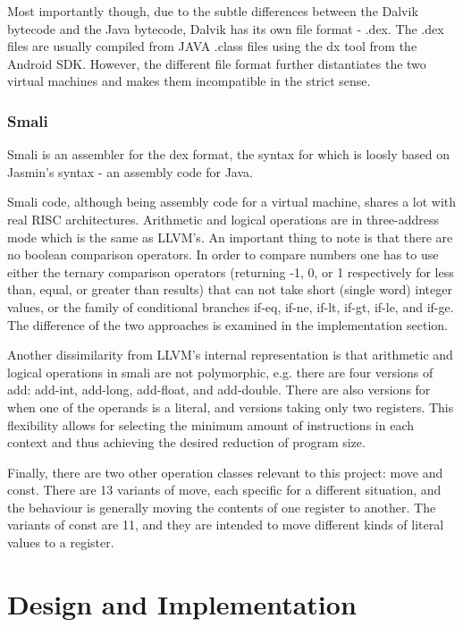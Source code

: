 \documentclass[parskip]{cs4rep}
\begin{document}
Most importantly though, due to the subtle differences between the Dalvik bytecode and the Java bytecode, Dalvik has its own file format - .dex. The .dex files are usually compiled from JAVA .class files using the dx tool from the Android SDK. However, the different file format further distantiates the two virtual machines and makes them incompatible in the strict sense.

\subsection{Smali}

Smali is an assembler for the dex format, the syntax for which is loosly based on Jasmin's syntax - an assembly code for Java\cite{GoogleProjectHosting2013}.

Smali code, although being assembly code for a virtual machine, shares a lot with real RISC architectures. Arithmetic and logical operations are in three-address mode\cite{TheAndroidOpenSourceProject2007} which is the same as LLVM's. An important thing to note is that there are no boolean comparison operators. In order to compare numbers one has to use either the ternary comparison operators (returning -1, 0, or 1 respectively for less than, equal, or greater than results) that can not take short (single word) integer values, or the family of conditional branches if-eq, if-ne, if-lt, if-gt, if-le, and if-ge. The difference of the two approaches is examined in the implementation section.

Another dissimilarity from LLVM's internal representation is that arithmetic and logical operations in smali are not polymorphic, e.g. there are four versions of add: add-int, add-long, add-float, and add-double. There are also versions for when one of the operands is a literal, and versions taking only two registers. This flexibility allows for selecting the minimum amount of instructions in each context and thus achieving the desired reduction of program size.

Finally, there are two other operation classes relevant to this project: move and const. There are 13 variants of move, each specific for a different situation, and the behaviour is generally moving the contents of one register to another. The variants of const are 11, and they are intended to move different kinds of literal values to a register.

\chapter{Design and Implementation}
\end{document}
